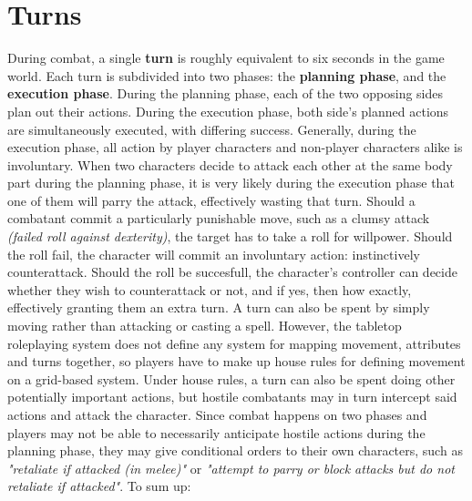 \documentclass[openany,11pt,a4paper]{book}
\begin{document}
\section{Turns}
During combat, a single \textbf{turn} is roughly equivalent to six seconds in the game world. Each turn is subdivided into two phases: the \textbf{planning phase}, and the \textbf{execution phase}. During the planning phase, each of the two opposing sides plan out their actions. During the execution phase, both side's planned actions are simultaneously executed, with differing success. Generally, during the execution phase, all action by player characters and non-player characters alike is involuntary. When two characters decide to attack each other at the same body part during the planning phase, it is very likely during the execution phase that one of them will parry the attack, effectively wasting that turn.\newline
Should a combatant commit a particularly punishable move, such as a clumsy attack \textit{(failed roll against dexterity)}, the target has to take a roll for willpower. Should the roll fail, the character will commit an involuntary action: instinctively counterattack. Should the roll be succesfull, the character's controller can decide whether they wish to counterattack or not, and if yes, then how exactly, effectively granting them an extra turn.\newline
A turn can also be spent by simply moving rather than attacking or casting a spell. However, the tabletop roleplaying system does not define any system for mapping movement, attributes and turns together, so players have to make up house rules for defining movement on a grid-based system. Under house rules, a turn can also be spent doing other potentially important actions, but hostile combatants may in turn intercept said actions and attack the character.\newline
Since combat happens on two phases and players may not be able to necessarily anticipate hostile actions during the planning phase, they may give conditional orders to their own characters, such as \textit{"retaliate if attacked (in melee)"} or \textit{"attempt to parry or block attacks but do not retaliate if attacked"}.\newline
To sum up:
\end{document}
